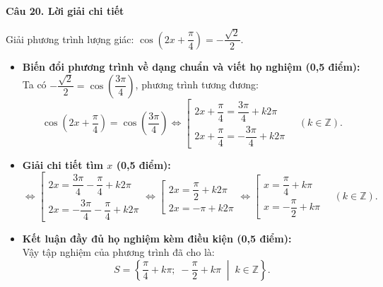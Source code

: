 \documentclass[12pt, a4paper]{article}
\begin{document}
\noindent\textbf{Câu 20. Lời giải chi tiết}\par
\begin{tcolorbox}[enhanced,breakable,colback=solutionbg,colframe=secondary!50!black,frame hidden,borderline west={3pt}{0pt}{secondary!50!black}]
Giải phương trình lượng giác: $\cos\left(2x + \dfrac{\pi}{4}\right) = -\dfrac{\sqrt{2}}{2}$.
\begin{itemize}[leftmargin=1.5em]
\item \textbf{Biến đổi phương trình về dạng chuẩn và viết họ nghiệm (0,5 điểm):}\\
Ta có $-\dfrac{\sqrt{2}}{2} = \cos\left(\dfrac{3\pi}{4}\right)$, phương trình tương đương:
$$\cos\left(2x + \dfrac{\pi}{4}\right) = \cos\left(\dfrac{3\pi}{4}\right) \Leftrightarrow \left[\begin{array}{l}
2x + \dfrac{\pi}{4} = \dfrac{3\pi}{4} + k2\pi \\[6pt]
2x + \dfrac{\pi}{4} = -\dfrac{3\pi}{4} + k2\pi
\end{array}\right. \quad (k \in \mathbb{Z}).$$

\item \textbf{Giải chi tiết tìm $x$ (0,5 điểm):}
$$\Leftrightarrow \left[\begin{array}{l}
2x = \dfrac{3\pi}{4} - \dfrac{\pi}{4} + k2\pi \\[6pt]
2x = -\dfrac{3\pi}{4} - \dfrac{\pi}{4} + k2\pi
\end{array}\right. \Leftrightarrow \left[\begin{array}{l}
2x = \dfrac{\pi}{2} + k2\pi \\[6pt]
2x = -\pi + k2\pi
\end{array}\right. \Leftrightarrow \left[\begin{array}{l}
x = \dfrac{\pi}{4} + k\pi \\[6pt]
x = -\dfrac{\pi}{2} + k\pi
\end{array}\right. \quad (k \in \mathbb{Z}).$$

\item \textbf{Kết luận đầy đủ họ nghiệm kèm điều kiện (0,5 điểm):}\\
Vậy tập nghiệm của phương trình đã cho là:
$$S = \left\{\dfrac{\pi}{4} + k\pi;\; -\dfrac{\pi}{2} + k\pi \;\middle|\; k \in \mathbb{Z}\right\}.$$
\end{itemize}
\end{tcolorbox}
\end{document}
